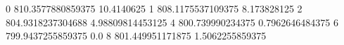0 810.3577880859375 10.4140625
1 808.1175537109375 8.173828125
2 804.9318237304688 4.98809814453125
4 800.739990234375 0.7962646484375
6 799.9437255859375 0.0
8 801.449951171875 1.5062255859375
